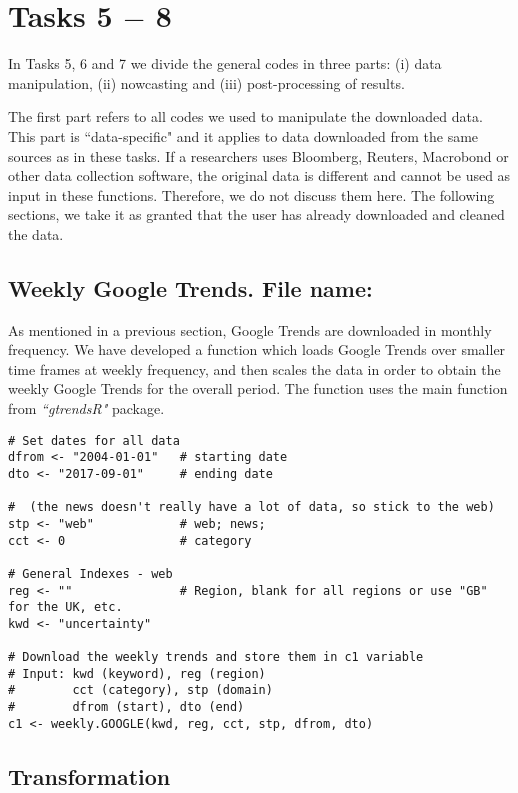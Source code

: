 \documentclass[12pt]{article}
\begin{document}
\section{Tasks 5 $-$ 8}

In Tasks 5, 6 and 7 we divide the general codes in three parts: (i) data
manipulation, (ii) nowcasting and (iii) post-processing of results.

The first part refers to all codes we used to manipulate the downloaded
data. This part is ``data-specific" and it applies to data downloaded from
the same sources as in these tasks. If a researchers uses Bloomberg,
Reuters, Macrobond or other data collection software, the original data is
different and cannot be used as input in these functions. Therefore, we do
not discuss them here. The following sections, we take it as granted that the user
has already downloaded and cleaned the data.

\subsection{Weekly Google Trends. File name: \color{blue}{Weekly-Google.R}}

As mentioned in a previous section, Google Trends are downloaded in monthly
frequency. We have developed a function which loads Google Trends over
smaller time frames at weekly frequency, and then scales the data in order
to obtain the weekly Google Trends for the overall period. The function uses
the main function from \emph{``gtrendsR"} package.

\begin{lstlisting}[title=\textbf{Weekly Google Trends.}]
# Set dates for all data
dfrom <- "2004-01-01"	# starting date
dto <- "2017-09-01"		# ending date

#  (the news doesn't really have a lot of data, so stick to the web)
stp <- "web"            # web; news;
cct <- 0                # category

# General Indexes - web
reg <- ""               # Region, blank for all regions or use "GB" for the UK, etc.
kwd <- "uncertainty"

# Download the weekly trends and store them in c1 variable
# Input: kwd (keyword), reg (region)
#		 cct (category), stp (domain)
#		 dfrom (start), dto (end)
c1 <- weekly.GOOGLE(kwd, reg, cct, stp, dfrom, dto)
\end{lstlisting}

\subsection{Transformation}
\end{document}

